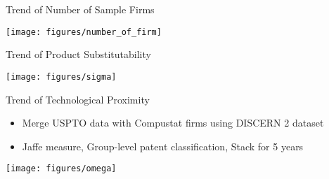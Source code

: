 \documentclass[
  10pt,               %
  aspectratio=169,     %
]{beamer}
\theoremstyle{plain}
\begin{document}
%
\begin{frame}{Trend of Number of Sample Firms}
  \begin{center}
    \texttt{[image: figures/number\_of\_firm]}
    \par\end{center}

\end{frame}

\begin{frame}{Trend of Product Substitutability}
  \begin{center}
    \texttt{[image: figures/sigma]}
    \par\end{center}

\end{frame}

\begin{frame}{Trend of Technological Proximity}
  \begin{itemize}
    \item Merge USPTO data with Compustat firms using DISCERN 2 dataset \citep{Arora2024-ad}
    \item Jaffe measure, Group-level patent classification, Stack for 5 years
  \end{itemize}
  \begin{center}
    \texttt{[image: figures/omega]}
    \par\end{center}
\end{frame}
\end{document}

